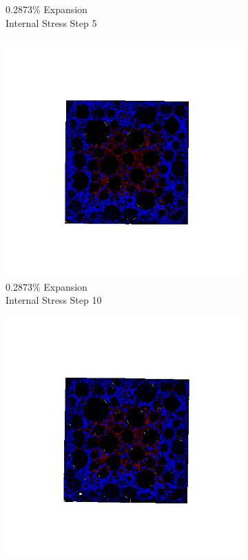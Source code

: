 \begin{figure}[h!]
\begin{subfigure}{.25\textwidth}
      \caption{0.2873\% Expansion\\Internal Stress Step 5}
    \end{subfigure}%
    \begin{subfigure}{.25\textwidth}
      \centering
      \includegraphics[width=1.0\linewidth]{Files/exp_3D/DEF/A30X0C_2_s10.png}
      \caption{0.2873\% Expansion\\Internal Stress Step 10}
    \end{subfigure}%
    \begin{subfigure}{.25\textwidth}
      \centering
      \includegraphics[width=1.0\linewidth]{Files/exp_3D/DEF/A30X0C_2_s15.png}

\end{subfigure}
\end{figure}
